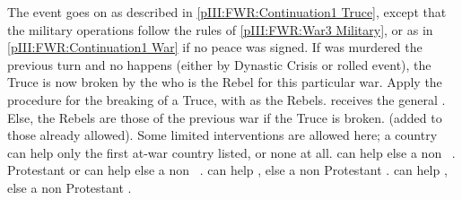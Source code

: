 \phevnt
\aparag The event goes on as described in \ref{pIII:FWR:Continuation1 Truce},
except that the military operations follow the rules of \ref{pIII:FWR:War3
  Military}, or as in \ref{pIII:FWR:Continuation1 War} if no peace was signed.
\bparag If  was murdered the previous turn and no
 happens (either by Dynastic Crisis or rolled event), the
Truce is now broken by the \lig who is the Rebel for this particular war.
Apply the procedure for the breaking of a Truce, with \lig as the Rebels.
\lig receives the general .
\bparag Else, the Rebels are those of the previous war if the Truce is broken.
 (added to those already allowed).
\bparag Some limited interventions are allowed here; a country can help only
the first at-war country listed, or none at all.
\bparag \HOL can help \hug else a non \CATHCR\ \FRA.
\bparag \ENG Protestant or \CATHCR can help \hug else a non \CATHCR\ \FRA.
\bparag \ENG \CATHCR can help \lig, else a non Protestant \FRA.
\bparag \SPA can help \lig, else a non Protestant \FRA.






